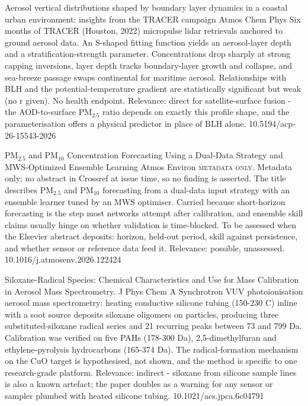 \documentclass[10pt]{article}
\begin{document}
{Aerosol vertical distributions shaped by boundary layer dynamics in a coastal urban environment: insights from the TRACER campaign}
{Atmos Chem Phys}
{Six months of TRACER (Houston, 2022) micropulse lidar retrievals anchored to ground aerosol data. An S-shaped fitting function yields an aerosol-layer depth and a stratification-strength parameter. Concentrations drop sharply at strong capping inversions, layer depth tracks boundary-layer growth and collapse, and sea-breeze passage swaps continental for maritime aerosol. Relationships with BLH and the potential-temperature gradient are statistically significant but weak (no r given). No health endpoint. Relevance: direct for satellite-surface fusion - the AOD-to-surface PM$_{2.5}$ ratio depends on exactly this profile shape, and the parameterisation offers a physical predictor in place of BLH alone.}
{10.5194/acp-26-15543-2026}

{PM$_{2.5}$ and PM$_{10}$ Concentration Forecasting Using a Dual-Data Strategy and MWS-Optimized Ensemble Learning}
{Atmos Environ}
{\textsc{metadata only.} Metadata only; no abstract in Crossref at issue time, so no finding is asserted. The title describes PM$_{2.5}$ and PM$_{10}$ forecasting from a dual-data input strategy with an ensemble learner tuned by an MWS optimiser. Carried because short-horizon forecasting is the step most networks attempt after calibration, and ensemble skill claims usually hinge on whether validation is time-blocked. To be assessed when the Elsevier abstract deposits: horizon, held-out period, skill against persistence, and whether sensor or reference data feed it. Relevance: possible, unassessed.}
{10.1016/j.atmosenv.2026.122424}

{Siloxane-Radical Species: Chemical Characteristics and Use for Mass Calibration in Aerosol Mass Spectrometry.}
{J Phys Chem A}
{Synchrotron VUV photoionisation aerosol mass spectrometry: heating conductive silicone tubing (150-230 C) inline with a soot source deposits siloxane oligomers on particles, producing three substituted-siloxane radical series and 21 recurring peaks between 73 and 799 Da. Calibration was verified on five PAHs (178-300 Da), 2,5-dimethylfuran and ethylene-pyrolysis hydrocarbons (165-374 Da). The radical-formation mechanism on the CuO target is hypothesised, not shown, and the method is specific to one research-grade platform. Relevance: indirect - siloxane from silicone sample lines is also a known artefact; the paper doubles as a warning for any sensor or sampler plumbed with heated silicone tubing.}
{10.1021/acs.jpca.6c04791}
\end{document}
